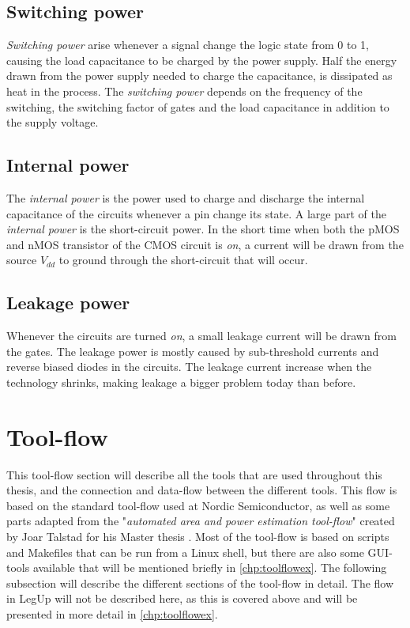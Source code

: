 \subsection{Switching power}
\textit{Switching power} arise whenever a signal change the logic state from 0 to 1, causing the load capacitance to be charged by the power supply. Half the energy drawn from the power supply needed to charge the capacitance, is dissipated as heat in the process. The \textit{switching power} depends on the frequency of the switching, the switching factor of gates and the load capacitance in addition to the supply voltage. 

\subsection{Internal power}
The \textit{internal power} is the power used to charge and discharge the internal capacitance of the circuits whenever a pin change its state. A large part of the \textit{internal power} is the short-circuit power. In the short time when both the pMOS and nMOS transistor of the CMOS circuit is \textit{on}, a current will be drawn from the source $V_{dd}$ to ground through the short-circuit that will occur. 

\subsection{Leakage power}
Whenever the circuits are turned \textit{on}, a small leakage current will be drawn from the gates. The leakage power is mostly caused by sub-threshold currents and reverse biased diodes in the circuits. The leakage current increase when the technology shrinks, making leakage a bigger problem today than before. 

\section{\label{sec:toolflowbg}Tool-flow}
This tool-flow section will describe all the tools that are used throughout this thesis, and the connection and data-flow between the different tools. This flow is based on the standard tool-flow used at Nordic Semiconductor, as well as some parts adapted from the "\textit{automated area and power estimation tool-flow}" created by Joar Talstad for his Master thesis \cite{talstad15master}. Most of the tool-flow is based on scripts and Makefiles that can be run from a Linux shell, but there are also some GUI-tools available that will be mentioned briefly in \cref{chp:toolflowex}. The following subsection will describe the different sections of the tool-flow in detail. The flow in LegUp will not be described here, as this is covered above and will be presented in more detail in \cref{chp:toolflowex}.

